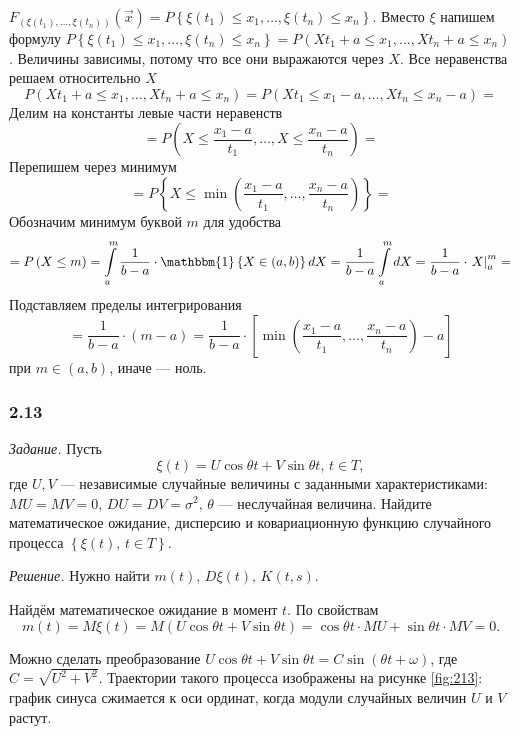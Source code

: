$F_{ \left( \xi \left( t_1 \right), \dotsc, \xi \left( t_n \right) \right) }
  \left( \vec{x} \right) =
  P \left\{ \xi \left( t_1 \right) \leq x_1, \dotsc, \xi \left( t_n \right) \leq x_n \right\} $.
Вместо $ \xi $ напишем формулу
$P \left\{ \xi \left( t_1 \right) \leq x_1, \dotsc, \xi \left( t_n \right) \leq x_n \right\} =
  P \left( Xt_1 + a \leq x_1, \dotsc, Xt_n + a \leq x_n \right) $.
Величины зависимы, потому что все они выражаются через $X$.
Все неравенства решаем относительно $X$
$$P \left( Xt_1 + a \leq x_1, \dotsc, Xt_n + a \leq x_n \right) =
  P \left( Xt_1 \leq x_1 - a, \dotsc, Xt_n \leq x_n - a \right) =$$
Делим на константы левые части неравенств
$$= P \left( X \leq \frac{x_1 - a}{t_1}, \dotsc, X \leq \frac{x_n - a}{t_n} \right) =$$
Перепишем через минимум
$$= P \left\{
    X \leq \min \left( \frac{x_1 - a}{t_1}, \dotsc, \frac{x_n - a}{t_n} \right)
  \right\} =$$
Обозначим минимум буквой $m$ для удобства
$$= P \left( X \leq m \right) =
  \int \limits_a^m \frac{1}{b - a} \cdot \mathbbm{1} \left\{ X \in \left( a, b \right) \right\} dX =
  \frac{1}{b - a} \int \limits_a^m dX =
  \frac{1}{b - a} \cdot \left. X \right|_a^m =$$
Подставляем пределы интегрирования
$$= \frac{1}{b - a} \cdot \left( m - a \right) =
  \frac{1}{b - a} \cdot
  \left[ \min \left( \frac{x_1 - a}{t_1}, \dotsc, \frac{x_n - a}{t_n} \right) - a \right] $$
при $m \in \left( a, b \right) $, иначе --- ноль.

\subsubsection*{2.13}

\textit{Задание.}
Пусть
$$ \xi \left( t \right) =
  U \cos \theta t + V \sin \theta t, \,
  t \in T,$$
где $U, V$ --- независимые случайные величины с заданными характеристиками:
$MU = MV = 0, \, DU = DV = \sigma^2, \, \theta $ --- неслучайная величина.
Найдите математическое ожидание, дисперсию и ковариационную функцию случайного процесса
$ \left\{ \xi \left( t \right), \, t \in T \right\} $.

\textit{Решение.}
Нужно найти $m \left( t \right), \, D \xi \left( t \right), \, K \left( t, s \right) $.

Найдём математическое ожидание в момент $t$.
По свойствам
$$m \left( t \right) =
  M \xi \left( t \right) =
  M \left( U \cos \theta t + V \sin \theta t \right) =
  \cos \theta t \cdot MU + \sin \theta t \cdot MV =
  0.$$

Можно сделать преобразование
$U \cos \theta t + V \sin \theta t = C \sin \left( \theta t + \omega \right) $,
где $C = \sqrt{U^2 + V^2}$.
Траектории такого процесса изображены на рисунке \ref{fig:213}:
график синуса сжимается к оси ординат, когда модули случайных величин $U$ и $V$ растут.

